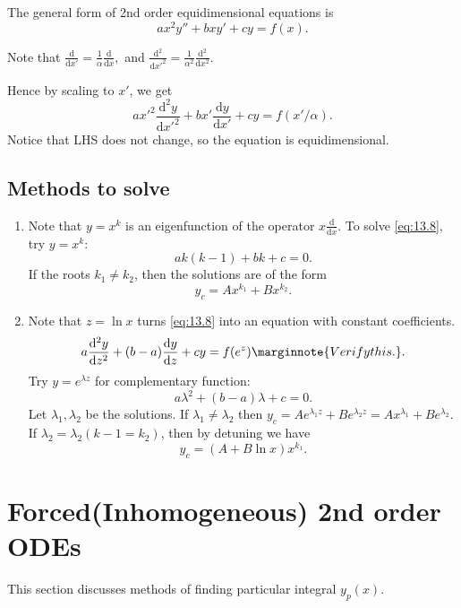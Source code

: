 \documentclass[10pt]{article}
\begin{document}
    The general form of 2nd order equidimensional equations is 
    \begin{equation}\label{eq:13.8}
        ax^2y''+bxy'+cy=f(x).
    \end{equation}
    \begin{remark}
        Note that $ \frac{\mathrm{d}}{\mathrm{d}x'}=\frac{1}{\alpha}\frac{\mathrm{d}}{\mathrm{d}x},$ and $ \frac{\mathrm{d}^2}{\mathrm{d}x'^2}=\frac{1}{\alpha^2}\frac{\mathrm{d}^2}{\mathrm{d}x^2}   $.
    \end{remark}
    Hence by scaling to $x'$, we get 
    \[
        ax'^2 \frac{\mathrm{d}^2y}{\mathrm{d}x'^2} +bx' \frac{\mathrm{d}y}{\mathrm{d}x'}+cy=f(x'/\alpha) 
    .\]
    Notice that LHS does not change, so the equation is equidimensional.
    \subsection{Methods to solve}
    \begin{enumerate}
        \item Note that $ y=x^k $ is an eigenfunction of the operator $ x \frac{\mathrm{d}}{\mathrm{d}x}  $. To solve \ref{eq:13.8}, try $ y=x^k $:
        \[
            ak(k-1)+bk+c=0
        .\]
        If the roots $ k_1\neq k_2 $, then the solutions are of the form
        \[
            y_c=Ax^{k_1}+Bx^{k_2}
        .\]
        \item Note that $ z=\ln x $ turns \ref{eq:13.8} into an equation with constant coefficients.
        \[
            a \frac{\mathrm{d}^2y}{\mathrm{d}z^2}+(b-a)\frac{\mathrm{d}y}{\mathrm{d}z}+cy = f(e^z) \marginnote{Verify this.}
        .\]
        Try $ y=e^{\lambda z} $ for complementary function:
        \[
            a \lambda^2+(b-a)\lambda+c=0
        .\]
        Let $ \lambda_1,\lambda_2 $ be the solutions. If $ \lambda_1\neq \lambda_2 $ then $ y_c=Ae^{\lambda_1 z}+Be^{\lambda_2 z}=Ax^{\lambda_1}+Be^{\lambda_2}$. If $ \lambda_2=\lambda_2(k-1=k_2) $, then by detuning we have 
        \[
            y_c=(A+B\ln x)x^{k_1}
        .\]
    \end{enumerate}
    \section{Forced(Inhomogeneous) 2nd order ODEs}
    This section discusses methods of finding particular integral $ y_p(x) $.
\end{document}
